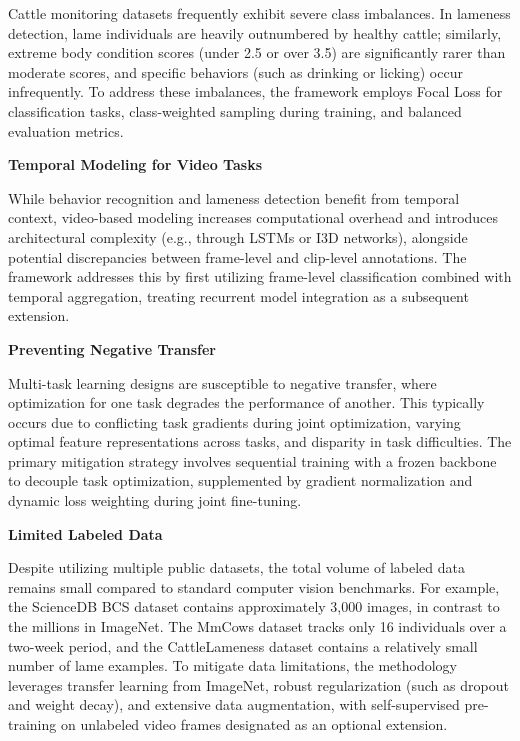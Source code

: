 Cattle monitoring datasets frequently exhibit severe class imbalances. In lameness detection, lame individuals are heavily outnumbered by healthy cattle; similarly, extreme body condition scores (under 2.5 or over 3.5) are significantly rarer than moderate scores, and specific behaviors (such as drinking or licking) occur infrequently. To address these imbalances, the framework employs Focal Loss for classification tasks, class-weighted sampling during training, and balanced evaluation metrics.


\textbf{Temporal Modeling for Video Tasks}

While behavior recognition and lameness detection benefit from temporal context, video-based modeling increases computational overhead and introduces architectural complexity (e.g., through LSTMs or I3D networks), alongside potential discrepancies between frame-level and clip-level annotations. The framework addresses this by first utilizing frame-level classification combined with temporal aggregation, treating recurrent model integration as a subsequent extension.


\textbf{Preventing Negative Transfer}

Multi-task learning designs are susceptible to negative transfer, where optimization for one task degrades the performance of another. This typically occurs due to conflicting task gradients during joint optimization, varying optimal feature representations across tasks, and disparity in task difficulties. The primary mitigation strategy involves sequential training with a frozen backbone to decouple task optimization, supplemented by gradient normalization and dynamic loss weighting during joint fine-tuning.


\textbf{Limited Labeled Data}

Despite utilizing multiple public datasets, the total volume of labeled data remains small compared to standard computer vision benchmarks. For example, the ScienceDB BCS dataset contains approximately 3,000 images, in contrast to the millions in ImageNet. The MmCows dataset tracks only 16 individuals over a two-week period, and the CattleLameness dataset contains a relatively small number of lame examples. To mitigate data limitations, the methodology leverages transfer learning from ImageNet, robust regularization (such as dropout and weight decay), and extensive data augmentation, with self-supervised pre-training on unlabeled video frames designated as an optional extension.
